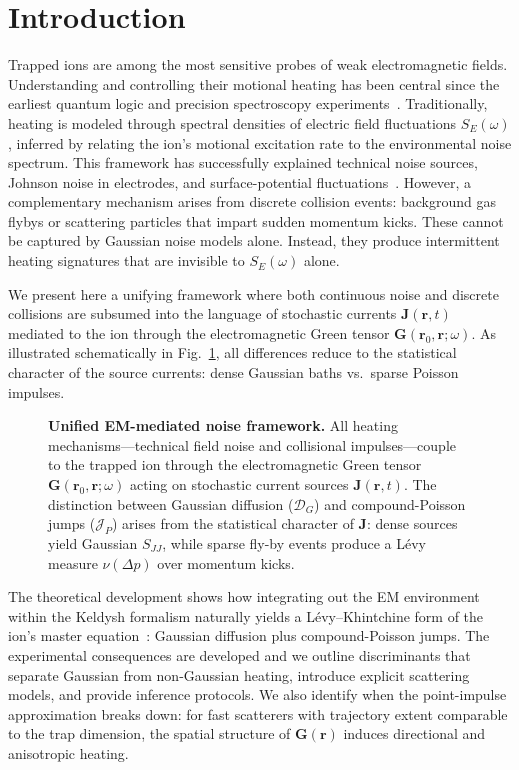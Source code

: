 \section{Introduction}
Trapped ions are among the most sensitive probes of weak electromagnetic fields.
Understanding and controlling their motional heating has been central since the earliest quantum logic and precision spectroscopy experiments~\cite{Turchette2000,Wineland1998}.
Traditionally, heating is modeled through spectral densities of electric field fluctuations $S_E(\omega)$, inferred by relating the ion's motional excitation rate to the environmental noise spectrum.
This framework has successfully explained technical noise sources, Johnson noise in electrodes, and surface-potential fluctuations~\cite{Brownnutt2015}.
However, a complementary mechanism arises from discrete collision events: background gas flybys or scattering particles that impart sudden momentum kicks.
These cannot be captured by Gaussian noise models alone.
Instead, they produce intermittent heating signatures that are invisible to $S_E(\omega)$ alone.

We present here a unifying framework where both continuous noise and discrete collisions are subsumed into the language of stochastic currents $\mathbf{J}(\mathbf{r},t)$ mediated to the ion through the electromagnetic Green tensor $\mathbf{G}(\mathbf{r}_0,\mathbf{r};\omega)$.
As illustrated schematically in Fig.~\ref{fig:em_mediation}, all differences reduce to the statistical character of the source currents: dense Gaussian baths vs.~sparse Poisson impulses.

\begin{figure}[t]
  \centering
  
  \caption{\textbf{Unified EM-mediated noise framework.}
  All heating mechanisms—technical field noise and collisional impulses—couple to the trapped ion through the electromagnetic Green tensor $\mathbf{G}(\mathbf{r}_0,\mathbf{r};\omega)$ acting on stochastic current sources $\mathbf{J}(\mathbf{r},t)$.
  The distinction between Gaussian diffusion ($\mathcal{D}_G$) and compound-Poisson jumps ($\mathcal{J}_P$) arises from the statistical character of $\mathbf{J}$: dense sources yield Gaussian $S_{JJ}$, while sparse fly-by events produce a L\'evy measure $\nu(\Delta p)$ over momentum kicks.}
  \label{fig:em_mediation}
\end{figure}

The theoretical development shows how integrating out the EM environment within the Keldysh formalism naturally yields a L\'evy--Khintchine form of the ion's master equation~\cite{Sornette2006}: Gaussian diffusion plus compound-Poisson jumps.
The experimental consequences are developed and we outline discriminants that separate Gaussian from non-Gaussian heating, introduce explicit scattering models, and provide inference protocols.
We also identify when the point-impulse approximation breaks down: for fast scatterers with trajectory extent comparable to the trap dimension, the spatial structure of $\mathbf{G}(\mathbf{r})$ induces directional and anisotropic heating.
